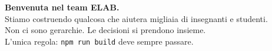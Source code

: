 \documentclass[11pt,a4paper]{article}
\begin{document}
\vfill

\begin{principiobox}
\centering
\textbf{Benvenuta nel team ELAB.}\\[0.3em]
Stiamo costruendo qualcosa che aiutera migliaia di insegnanti e studenti.\\
Non ci sono gerarchie. Le decisioni si prendono insieme.\\
L'unica regola: \texttt{npm run build} deve sempre passare.
\end{principiobox}
\end{document}

